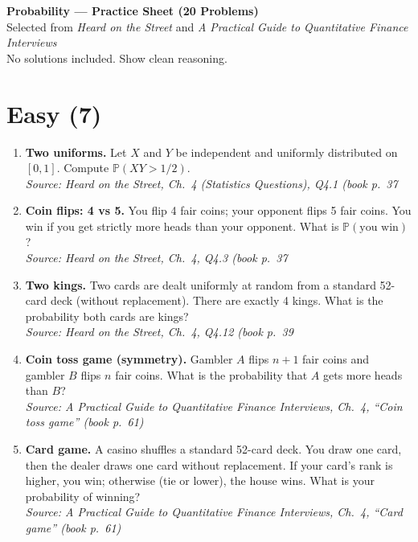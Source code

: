\documentclass[11pt]{article}
\begin{document}
\begin{center}
{\LARGE \textbf{Probability — Practice Sheet (20 Problems)}}\\[0.3em]
{\small Selected from \textit{Heard on the Street} and \textit{A Practical Guide to Quantitative Finance Interviews}}\\
{\small No solutions included. Show clean reasoning.}
\end{center}

\section*{Easy (7)}

\begin{enumerate}[label=\textbf{\arabic*.}]

\item \textbf{Two uniforms.}
Let $X$ and $Y$ be independent and uniformly distributed on $[0,1]$.
Compute $\mathbb{P}(XY>1/2)$.\\
\hfill{\small\textit{Source: Heard on the Street, Ch.\ 4 (Statistics Questions), Q4.1 (book p.\ 37}}

\item \textbf{Coin flips: 4 vs 5.}
You flip 4 fair coins; your opponent flips 5 fair coins. You win if you get strictly more heads than your opponent.
What is $\mathbb{P}(\text{you win})$?\\
\hfill{\small\textit{Source: Heard on the Street, Ch.\ 4, Q4.3 (book p.\ 37}}

\item \textbf{Two kings.}
Two cards are dealt uniformly at random from a standard 52-card deck (without replacement). There are exactly 4 kings.
What is the probability both cards are kings?\\
\hfill{\small\textit{Source: Heard on the Street, Ch.\ 4, Q4.12 (book p.\ 39}}

\item \textbf{Coin toss game (symmetry).}
Gambler $A$ flips $n+1$ fair coins and gambler $B$ flips $n$ fair coins.
What is the probability that $A$ gets more heads than $B$?\\
\hfill{\small\textit{Source: A Practical Guide to Quantitative Finance Interviews, Ch.\ 4, ``Coin toss game'' (book p.\ 61)}}

\item \textbf{Card game.}
A casino shuffles a standard 52-card deck. You draw one card, then the dealer draws one card without replacement.
If your card’s rank is higher, you win; otherwise (tie or lower), the house wins.
What is your probability of winning?\\
\hfill{\small\textit{Source: A Practical Guide to Quantitative Finance Interviews, Ch.\ 4, ``Card game'' (book p.\ 61)}}


\end{enumerate}
\end{document}
